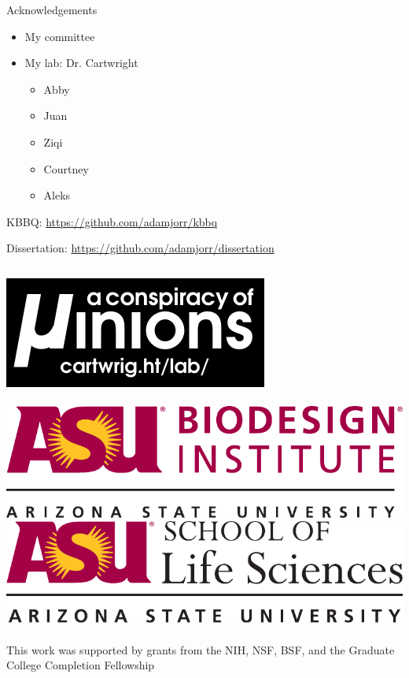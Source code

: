 \documentclass[table]{beamer}
\begin{document}
\begin{frame}{Acknowledgements}
\begin{itemize}
\item My committee
\item My lab: Dr. Cartwright
	\begin{itemize}
	\item Abby
	\item Juan
	\item Ziqi
	\item Courtney
	\item Aleks
	\end{itemize}
\end{itemize}

KBBQ:  \url{https://github.com/adamjorr/kbbq}

Dissertation:  \url{https://github.com/adamjorr/dissertation}

\begin{columns}
	\includegraphics[width=.9\linewidth]{lab_logo.pdf}
	\\~\\
	\includegraphics[width=.9\linewidth]{biodesign_logo.pdf}
	\includegraphics[width=.9\linewidth]{sols_logo.pdf}
	\\~\\
	This work was supported by grants from the NIH, NSF, BSF, and the Graduate College Completion Fellowship
\end{columns}

\end{frame}
\end{document}
